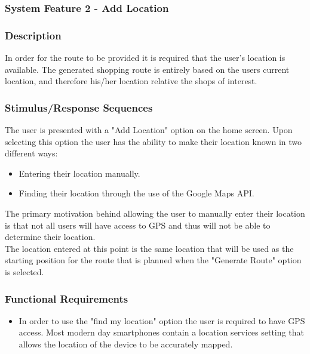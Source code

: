 \documentclass[10pt, a4paper, onecolumn]{scrartcl}
\begin{document}
		\subsubsection{System Feature 2 - Add Location}
				
			\subsubsection*{Description}
			
				In order for the route to be provided it is required that the user's location is available. The generated shopping route is entirely based on the users current location, and therefore his/her location relative the shops of interest. 
				
			\subsubsection*{Stimulus/Response Sequences}
			
				The user is presented with a "Add Location" option on the home screen. Upon selecting this option the user has the ability to make their location known in two different ways:
				
				\begin{itemize}
					\item Entering their location manually.
					\item Finding their location through the use of the Google Maps API.
				\end{itemize}
				
				The primary motivation behind allowing the user to manually enter their location is that not all users will have access to GPS and thus will not be able to determine their location. \\
				
				The location entered at this point is the same location that will be used as the starting position for the route that is planned when the "Generate Route" option is selected.
				
			\subsubsection*{Functional Requirements}
			
				\begin{itemize}
					\item In order to use the "find my location" option the user is required to have GPS access. Most modern day smartphones contain a location services setting that allows the location of the device to be accurately mapped. 
				\end{itemize}
				
\end{document}
